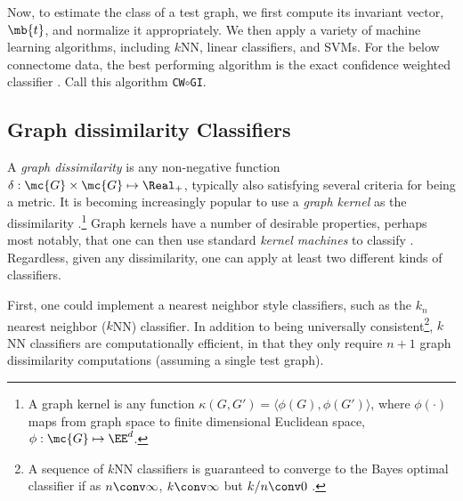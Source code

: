 \documentclass[10pt,journal,cspaper,compsoc]{IEEEtran}
\begin{document}
Now, to estimate the class of a test graph, we first compute its invariant vector, $\mb{t}$, and normalize it appropriately.  We then apply a variety of machine learning algorithms, including $k$NN, linear classifiers, and SVMs.  For the below connectome data, the best performing algorithm is the exact confidence weighted classifier \cite{Crammer2008}.  Call this algorithm \texttt{CW}$\circ$\texttt{GI}.








\subsection{Graph dissimilarity Classifiers} %
\label{sub:graph_dissimilarity_classifiers}


A \emph{graph dissimilarity} is any non-negative function $\delta: \mc{G} \times \mc{G} \mapsto \Real_+$, typically also satisfying several criteria for being a metric.  %
It is becoming increasingly popular to use a \emph{graph kernel} as the dissimilarity \cite{Bunke2011}.\footnote{A graph kernel is any function $\kappa(G,G')=\langle \phi(G), \phi(G') \rangle$, where $\phi(\cdot)$ maps from graph space to finite dimensional Euclidean space, $\phi: \mc{G} \mapsto \EE^d$.}  Graph kernels have a number of desirable properties, perhaps most notably, that one can then use standard \emph{kernel machines} to classify \cite{Vapnik1998}.	Regardless, given any dissimilarity, one can apply at least two different kinds of classifiers.


First, one could implement a nearest neighbor style classifiers, such as the $k_n$ nearest neighbor ($k$NN) classifier.  In addition to being universally consistent\footnote{A sequence of $k$NN classifiers is guaranteed to converge to the Bayes optimal classifier  if  as $n \conv \infty$, $k \conv \infty$ but $k/n \conv 0$ \cite{Devroye1997}.}, $k$NN classifiers are computationally efficient, in that they only require $n+1$ graph dissimilarity computations (assuming a single test graph).  
\end{document}
